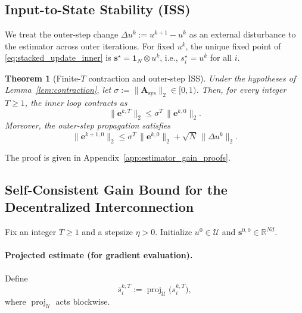 \documentclass[letterpaper, 10 pt, conference]{ieeeconf} %
\newtheorem{theorem}{Theorem}
\DeclareMathOperator{\proj}{proj}
\begin{document}
\subsection{Input-to-State Stability (ISS)}
We treat the outer-step change $\Delta u^{k}:=u^{k+1}-u^{k}$ as an external disturbance to the estimator across outer iterations. For fixed $u^{k}$, the unique fixed point of \eqref{eq:stacked_update_inner} is $\mathbf{s}^\star=\mathbf{1}_N\otimes u^{k}$, i.e., $s_i^\star=u^{k}$ for all $i$.
\begin{theorem}[Finite-$T$ contraction and outer-step ISS]\label{thm:iss_2ts}
Under the hypotheses of Lemma~\ref{lem:contraction}, let $\sigma:=\|\mathbf{A}_{\mathrm{sys}}\|_2\in[0,1)$. Then, for every integer $T\ge1$, the inner loop contracts as
\begin{equation}\label{eq:inner_contr_T}
\|\mathbf{e}^{k,T}\|_2 \le \sigma^{T}\,\|\mathbf{e}^{k,0}\|_2.
\end{equation}
Moreover, the outer-step propagation satisfies
\begin{equation}\label{eq:outer_iss}
\|\mathbf{e}^{k+1,0}\|_2
\le \sigma^{T}\,\|\mathbf{e}^{k,0}\|_2 + \sqrt{N}\,\|\Delta u^{k}\|_2.
\end{equation}
\end{theorem}
The proof is given in Appendix~\ref{app:estimator_gain_proofs}.
\subsection{Self-Consistent Gain Bound for the Decentralized Interconnection}\label{subsec:small_gain}
Fix an integer \(T\ge1\) and a stepsize \(\eta>0\). Initialize
\(u^0\in\mathcal U\) and \(\mathbf s^{0,0}\in\mathbb R^{Nd}\).
\paragraph{Projected estimate (for gradient evaluation).}
Define
\begin{equation}\label{eq:proj_estimate}
\bar s_i^{k,T} := \proj_{\mathcal U}\!\big(s_i^{k,T}\big),
\end{equation}
where $\proj_{\mathcal U}$ acts blockwise.
\end{document}
